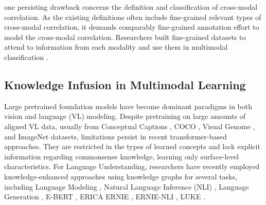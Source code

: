 one persisting drawback 
concerns the definition and classification of cross-modal correlation. As the existing definitions often include fine-grained relevant types of cross-modal correlation, it demands comparably fine-grained annotation effort 
to model the cross-modal correlation.
Researchers built fine-grained datasets to attend to information from each modality and use them in multimodal classification \cite{chen2015velda,henning2017estimating,otto2020characterization,zhang2018equal,kruk2019integrating,vempala2019categorizing}.


\subsection{Knowledge Infusion in Multimodal Learning}
\label{sec:knowledge-infusion-mm-learning}
Large pretrained foundation models have become dominant paradigms in both vision and language (VL) modeling. Despite pretraining on large amounts of aligned VL data, usually from Conceptual Captions \cite{Sharma2018-qk}, COCO \cite{Ren2015-oq}, Visual Genome \cite{Krishna2017-xz}, and ImageNet \cite{deng2009imagenet} datasets, limitations persist in recent transformer-based approaches. They are restricted in the types of learned concepts and lack explicit information regarding commonsense knowledge, learning only surface-level characteristics.  For Language Understanding, researchers have recently employed knowledge-enhanced approaches using knowledge graphs for several tasks, including Language Modeling \cite{yasunaga2022deep,zhang2022greaselm,Logan2019-tk,Lu2021-xe,kursuncu2020kil}, Natural Language Inference (NLI) \cite{Ni2021-db}, Language Generation \cite{Yu2022-uv,peters2019knowledge}, E-BERT \cite{Wu2022-ah}, ERICA \cite{Qin2020-et} ERNIE \cite{Zhang2021-ov}, ERNIE-NLI \cite{Bauer2021-rv}, LUKE \cite{Yamada2020-zc}.  

